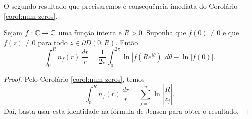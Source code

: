     O segundo resultado que precisaremos é consequência imediata do 
    Corolário \ref{corol:num-zeros}.
    \begin{corolario}
    \label{corol:jensen-com-zeros}
        Sejam $f:\mathbb{C}\to\mathbb{C}$ uma função inteira e $R>0$. Suponha que $f(0)\neq 0$
        e que $f(z)\neq 0$ para todo $z\in\partial D(0,R)$. Então
        \begin{equation*}
            \int_0^R n_f(r) \, \frac{dr}{r}
            = \frac{1}{2\pi} \int_0^{2\pi} \ln|f(Re^{i\theta})| \, d\theta
            - \ln|f(0)|.
        \end{equation*}
    \end{corolario}
    \begin{proof}
       Pelo Corolário \ref{corol:num-zeros}, temos
       \begin{equation*}
           \int_0^R n_f(r) \, \frac{dr}{r} 
           = \sum_{j=1}^n \ln\left|\frac{R}{z_j}\right|.
       \end{equation*}
       Daí, basta usar esta identidade na fórmula de Jensen para obter o resultado.
    \end{proof}
